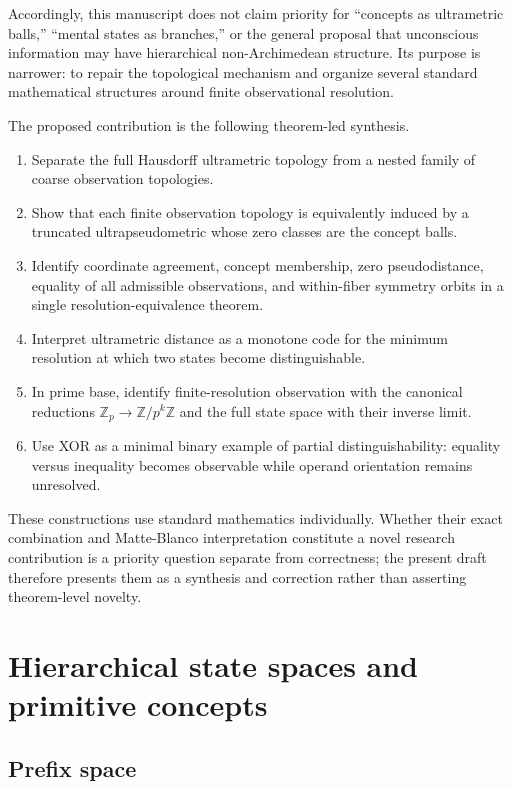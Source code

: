 \documentclass[11pt]{article}
\theoremstyle{definition}
\theoremstyle{remark}
\begin{document}
Accordingly, this manuscript does not claim priority for ``concepts as ultrametric balls,'' ``mental states as branches,'' or the general proposal that unconscious information may have hierarchical non-Archimedean structure.  Its purpose is narrower: to repair the topological mechanism and organize several standard mathematical structures around finite observational resolution.

The proposed contribution is the following theorem-led synthesis.
\begin{enumerate}[label=(C\arabic*)]
\item Separate the full Hausdorff ultrametric topology from a nested family of coarse observation topologies.
\item Show that each finite observation topology is equivalently induced by a truncated ultrapseudometric whose zero classes are the concept balls.
\item Identify coordinate agreement, concept membership, zero pseudodistance, equality of all admissible observations, and within-fiber symmetry orbits in a single resolution-equivalence theorem.
\item Interpret ultrametric distance as a monotone code for the minimum resolution at which two states become distinguishable.
\item In prime base, identify finite-resolution observation with the canonical reductions $\mathbb Z_p\to\mathbb Z/p^k\mathbb Z$ and the full state space with their inverse limit.
\item Use XOR as a minimal binary example of partial distinguishability: equality versus inequality becomes observable while operand orientation remains unresolved.
\end{enumerate}

These constructions use standard mathematics individually.  Whether their exact combination and Matte-Blanco interpretation constitute a novel research contribution is a priority question separate from correctness; the present draft therefore presents them as a synthesis and correction rather than asserting theorem-level novelty.

\section{Hierarchical state spaces and primitive concepts}

\subsection{Prefix space}
\end{document}
